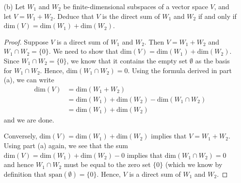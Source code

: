 \begin{enumerate}
\begin{proof}
        Now, we will show that \( \beta \) spans \( W_{1} + W_{2} \). Observe that \( \text{span}(\beta) \subseteq W_{1} + W_{2} \). Now, we will show \( W_{1} + W_{2} \subseteq \text{span}(\beta) \). Suppose we take a vector \( v \in W_{1} + W_{2} \) that is not in \( \beta \) and adjoin this vector in \( \beta \). Note that \( \beta \cup \{ v \}  \) produces a linearly dependent set that by which Theorem 1.7 implies that \( v \in \text{span}(\beta) \) and we are done. Hence, \( \beta \) spans \( W_{1} + W_{2} \) and thus \( \beta \) is a basis.
    
        Note that \( \beta \) contains exactly \( m + p + k  \) vectors. Hence,  denote \( \text{dim}(W_{1} + W_{2}) = m + p + k  \) which can be re-written as 
        \begin{align*}
            \text{dim}(W_{1} + W_{2}) &= m + p + k  \\
                                      &= (k+m) + (k+p) - k \\
                                      &= \text{dim}(W_{1}) + \text{dim}(W_{2}) - \text{dim}(W_{1} \cap W_{2}).
        \end{align*}
        \end{proof}
    \item[(b)] Let \( W_{1}  \) and \( W_{2} \) be finite-dimensional subspaces of a vector space \( V  \), and let \( V = W_{1} + W_{2} \). Deduce that \( V  \) is the direct sum of \( W_{1} \) and \( W_{2} \) if and only if \( \text{dim}(V) = \text{dim}(W_{1}) + \text{dim}(W_{2}) \).
        \begin{proof}
        Suppose \( V  \) is a direct sum of \( W_{1}  \) and \( W_{2} \). Then \( V = W_{1} + W_{2}  \) and \( W_{1} \cap W_{2} = \{ 0 \}  \). We need to show that \( \text{dim}(V) = \text{dim}(W_{1}) + \text{dim}(W_{2}) \). Since \( W_{1} \cap W_{2} = \{ 0  \}  \), we know that it contains the empty set \( \emptyset \) as the basis for \( W_{1} \cap W_{2} \). Hence, \( \text{dim}(W_{1} \cap W_{2}) = 0  \). Using the formula derived in part (a), we can write
        \begin{align*}
            \text{dim}(V) &= \text{dim}(W_{1} + W_{2}) \\
                          &= \text{dim}(W_{1}) + \text{dim}(W_{2}) - \text{dim}(W_{1} \cap W_{2}) \\
                          &= \text{dim}(W_{1}) + \text{dim}(W_{2})
        \end{align*}
        and we are done.

        Conversely, \( \text{dim}(V) = \text{dim}(W_{1}) + \text{dim}(W_{2}) \) implies that \( V = W_{1} + W_{2} \). Using part (a) again, we see that the sum \( \text{dim}(V) = \text{dim}(W_{1}) + \text{dim}(W_{2}) -  0  \) implies that \( \text{dim}(W_{1} \cap W_{2}) = 0  \)  and hence \( W_{1} \cap W_{2}  \) must be equal to the zero set \( \{ 0 \}  \) (which we know by definition that \( \text{span}(\emptyset) = \{ 0 \}  \). Hence, \( V  \) is a direct sum of \( W_{1} \) and \( W_{2} \).
        \end{proof}
\end{enumerate}

